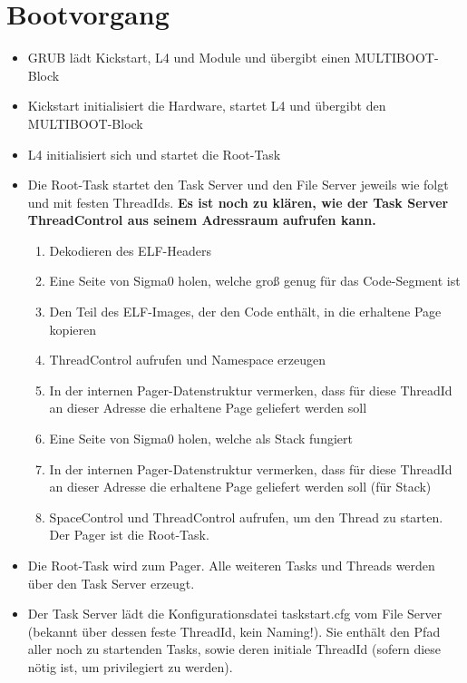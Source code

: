 \section{Bootvorgang}

\begin{itemize}
	\item GRUB lädt Kickstart, L4 und Module und übergibt einen MULTIBOOT-Block
	\item Kickstart initialisiert die Hardware, startet L4 und übergibt den MULTIBOOT-Block
	\item L4 initialisiert sich und startet die Root-Task

	\item Die Root-Task startet den Task Server und den File Server jeweils wie folgt und mit festen ThreadIds. \textbf{Es ist noch zu klären, wie der Task Server ThreadControl aus seinem Adressraum aufrufen kann.}
	\begin{enumerate}
		\item Dekodieren des ELF-Headers
		\item Eine Seite von Sigma0 holen, welche groß genug für das Code-Segment ist
		\item Den Teil des ELF-Images, der den Code enthält, in die erhaltene Page kopieren
		\item ThreadControl aufrufen und Namespace erzeugen
		\item In der internen Pager-Datenstruktur vermerken, dass für diese ThreadId an dieser Adresse die erhaltene Page geliefert werden soll
		\item Eine Seite von Sigma0 holen, welche als Stack fungiert
		\item In der internen Pager-Datenstruktur vermerken, dass für diese ThreadId an dieser Adresse die erhaltene Page geliefert werden soll (für Stack)
		\item SpaceControl und ThreadControl aufrufen, um den Thread zu starten. Der Pager ist die Root-Task.
	\end{enumerate}
	
	\item Die Root-Task wird zum Pager. Alle weiteren Tasks und Threads werden über den Task Server erzeugt.
	
	\item Der Task Server lädt die Konfigurationsdatei taskstart.cfg vom File Server (bekannt über dessen feste ThreadId, kein Naming!). Sie enthält den Pfad aller noch zu startenden Tasks, sowie deren initiale ThreadId (sofern diese nötig ist, um privilegiert zu werden).
	

\end{itemize}
